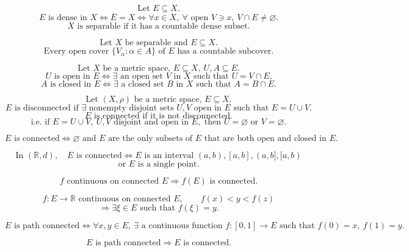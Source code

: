 \documentclass[11pt]{article}
\newcommand{\R}{\mathbb R}
\begin{document}
\[
\text{Let }E\subseteq X.
\]
\[
E\text{ is dense in }X\Longleftrightarrow
\overline E=X
\Longleftrightarrow
\forall x\in X,\ \forall\text{ open }V\ni x,\ V\cap E\ne\varnothing.
\]
\[
X\text{ is separable if it has a countable dense subset.}
\]

\[
\text{Let }X\text{ be separable and }E\subseteq X.
\]
\[
\text{Every open cover }\{V_\alpha:\alpha\in A\}\text{ of }E
\text{ has a countable subcover.}
\]

\[
\text{Let }X\text{ be a metric space, }E\subseteq X,\ U,A\subseteq E.
\]
\[
U\text{ is open in }E
\Longleftrightarrow \exists\text{ an open set }V\text{ in }X\text{ such that }U=V\cap E.
\]
\[
A\text{ is closed in }E
\Longleftrightarrow \exists\text{ a closed set }B\text{ in }X\text{ such that }A=B\cap E.
\]

\newpage


\[
\text{Let }(X,\rho)\text{ be a metric space, }E\subseteq X.
\]
\[
E\text{ is disconnected if }\exists\text{ nonempty disjoint sets }U,V\text{ open in }E
\text{ such that }E=U\cup V.
\]
\[
E\text{ is connected if it is not disconnected.}
\]
\[
\text{i.e. if }E=U\cup V,\ U,V\text{ disjoint and open in }E,\text{ then }U=\varnothing\text{ or }V=\varnothing.
\]

\[
E\text{ is connected}\Longleftrightarrow
\varnothing\text{ and }E\text{ are the only subsets of }E\text{ that are both open and closed in }E.
\]

\[
\text{In }(\R,d),\quad
E\text{ is connected}\Longleftrightarrow
E\text{ is an interval }(a,b),[a,b],(a,b],[a,b)
\]
\[
\text{or }E\text{ is a single point.}
\]

\[
f\text{ continuous on connected }E
\Longrightarrow f(E)\text{ is connected.}
\]

\[
f:E\to\R\text{ continuous on connected }E,\qquad f(x)<y<f(z)
\]
\[
\Longrightarrow \exists \xi\in E\text{ such that }f(\xi)=y.
\]

\[
E\text{ is path connected}
\Longleftrightarrow
\forall x,y\in E,\ \exists\text{ a continuous function }f:[0,1]\to E
\text{ such that }f(0)=x,\ f(1)=y.
\]

\[
E\text{ is path connected}\Longrightarrow E\text{ is connected.}
\]
\end{document}
